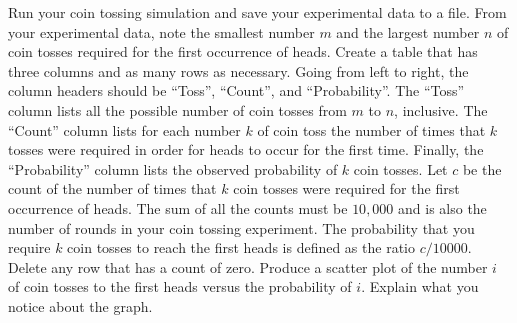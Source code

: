 \documentclass[a4paper,oneside,12pt]{article}
\begin{document}
\begin{problem}
\begin{packedenum}
  \item\label{subprob:coin_simulation_frequency_distribution}
    Run your coin tossing simulation and save your experimental data
    to a file.  From your experimental data, note the smallest number
    $m$ and the largest number $n$ of coin tosses required for the
    first occurrence of heads.  Create a table that has three columns
    and as many rows as necessary.  Going from left to right, the
    column headers should be ``Toss'', ``Count'', and
    ``Probability''.  The ``Toss'' column lists all the possible
    number of coin tosses from $m$ to $n$, inclusive.  The ``Count''
    column lists for each number $k$ of coin toss the number of times
    that $k$ tosses were required in order for heads to occur for the
    first time.  Finally, the ``Probability'' column lists the
    observed probability of $k$ coin tosses.  Let $c$ be the count of
    the number of times that $k$ coin tosses were required for the
    first occurrence of heads.  The sum of all the counts must be
    $10,000$ and is also the number of rounds in your coin tossing
    experiment.  The probability that you require $k$ coin tosses to
    reach the first heads is defined as the ratio $c / 10000$.  Delete
    any row that has a count of zero.  Produce a scatter plot of the
    number $i$ of coin tosses to the first heads versus the
    probability of $i$.  Explain what you notice about the graph.


\end{packedenum}
\end{problem}
\end{document}
